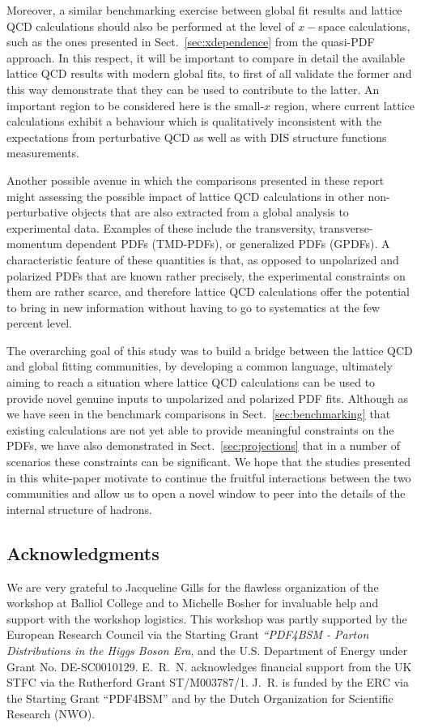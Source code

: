 Moreover, a similar benchmarking exercise between global fit results and lattice
QCD calculations should also be performed at the level of
$x-$space calculations, such as the ones presented in Sect.~\ref{sec:xdependence}
from the quasi-PDF approach.
%
In this respect, it will be important to compare in detail the available lattice
QCD results with modern global fits, to first of all validate the former and
this way demonstrate that they can be used to contribute to the latter.
%
An important region to be considered here is the small-$x$ region, where current lattice
calculations exhibit a behaviour which is qualitatively inconsistent with
the expectations from perturbative QCD as well as with DIS structure functions measurements.

Another possible avenue in which the comparisons presented in these report might assessing
the possible impact of lattice QCD calculations in other non-perturbative objects that
are also extracted from a global analysis to experimental data.
%
Examples of these include the transversity, transverse-momentum dependent PDFs (TMD-PDFs),
or generalized PDFs (GPDFs).
%
A characteristic feature of these quantities is that, as opposed to unpolarized and
polarized PDFs that are known rather precisely, the experimental constraints on them
are rather scarce, and therefore lattice QCD calculations offer the potential
to bring in new information without having to go to systematics at the few percent level.

The overarching goal of this study was to build a bridge between the lattice QCD
and global fitting communities, by developing a common language, ultimately
aiming to reach a situation where
lattice QCD calculations can be used to provide novel genuine inputs
to unpolarized and polarized PDF fits.
%
Although as we have seen in the benchmark comparisons in Sect.~\ref{sec:benchmarking} that
existing calculations are not yet able to provide meaningful constraints on the
PDFs, we have also demonstrated in Sect.~\ref{sec:projections} that in a number
of scenarios these constraints can be significant.
%
We hope that the studies presented in this white-paper motivate to continue the fruitful
interactions between the two communities and allow us to open a novel window
to peer into the details of the internal structure of hadrons.


\subsection*{Acknowledgments}

We are very grateful to Jacqueline Gills for the flawless organization
of the workshop at Balliol College and to Michelle Bosher for
invaluable help and support with the workshop logistics.
%
This workshop was partly supported by the European Research Council via
the Starting Grant {\it ``PDF4BSM - Parton Distributions in the
  Higgs Boson Era},
and
the U.S. Department of Energy under Grant No. DE-SC0010129.
%
E.~R.~N. acknowledges financial support from the
UK STFC via the Rutherford Grant ST/M003787/1.
%
J.~R. is funded by the ERC via the Starting Grant ``PDF4BSM'' and by the
Dutch Organization for Scientific Research (NWO).
